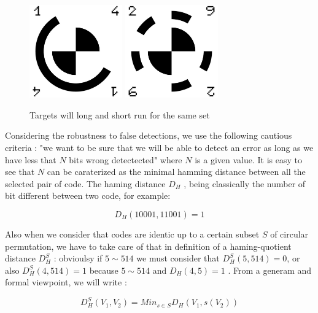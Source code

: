 \begin{figure}
\centering
	\includegraphics[width=4cm]{Methods/Images/IGN-14.jpg}
	\includegraphics[width=4cm]{Methods/Images/IGN-29.jpg}
	\caption{Targets will long and short run for the same set}
\label{fig:CodeT:RL}
\end{figure}

Considering the robustness to false detections, we  use the following cautious criteria : "we want to be sure
that we will be able to detect an error as long as we have less that $N$  bits wrong detectected"
where $N$ is a given value.  It is easy to see that $N$  can be caraterized as the minimal hamming 
distance between all the selected pair of code.
The haming distance $D_H$ , being classically the number of bit different between two code, for example:

\begin{equation}
	D_H(10001,11001) = 1
\end{equation}

Also when we consider that codes are identic up to a certain subset $S$ of circular permutation,
we have to take care of that in definition of a haming-quotient distance $D^S_H$ :
 obvioulsy if $5 \sim 514 $ we must consider that $D^S_H(5,514)=0$,  or also $D^S_H(4,514)=1$ because
 $5 \sim 514 $ and $D_H(4,5)=1$ .  From a generam and formal viewpoint, we will write  :

\begin{equation}
	D^S_H(V_1,V_2) =  Min_{s\in S} D_H(V_1,s(V_2))
\end{equation}


